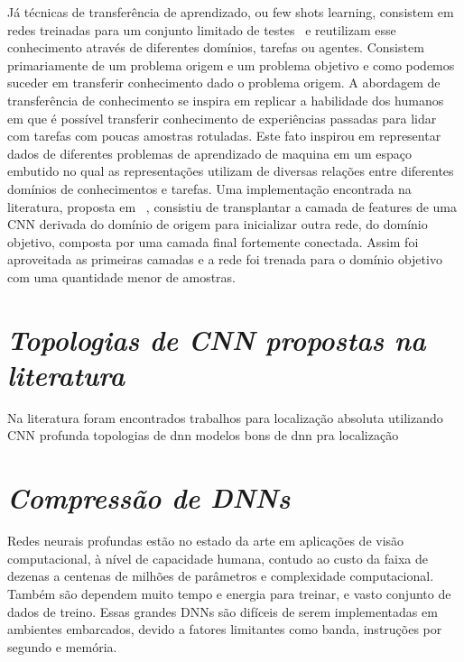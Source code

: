 Já técnicas de transferência de aprendizado, ou few shots learning, consistem em redes treinadas para um conjunto limitado de testes~\cite{rostami2019learning}
e reutilizam esse conhecimento através de diferentes domínios, tarefas ou agentes. Consistem primariamente de um problema origem e um problema objetivo e como podemos suceder em transferir conhecimento dado o problema origem. A abordagem de transferência de conhecimento se inspira em replicar a habilidade dos humanos em que é possível transferir conhecimento de experiências passadas para lidar com tarefas com poucas amostras rotuladas. Este fato inspirou em representar dados de diferentes problemas de aprendizado de maquina em um espaço embutido no qual as representações utilizam de diversas relações entre diferentes domínios de conhecimentos e tarefas. Uma implementação encontrada na literatura, proposta em ~\cite{DBLP:journals/corr/abs-1811-04863}, consistiu de transplantar a camada de features de uma CNN derivada do domínio de origem para inicializar outra rede, do domínio objetivo, composta por uma camada final fortemente conectada. Assim foi aproveitada as primeiras camadas e a rede foi trenada para o domínio objetivo com uma quantidade menor de amostras.

\section{\textit{Topologias de CNN propostas na literatura}}\label{sec:Cap2_MR}

 Na literatura foram encontrados trabalhos para localização absoluta utilizando CNN profunda
topologias de dnn  modelos bons de dnn pra localização 





\section{\textit{Compressão de DNNs}}\label{sec:Cap2_MR}


Redes neurais profundas estão no estado da arte em aplicações de visão computacional, à nível de capacidade humana, contudo ao custo da faixa de dezenas a centenas de milhões de parâmetros e complexidade computacional. Também são dependem muito tempo e energia para treinar, e vasto conjunto de dados de treino. Essas grandes DNNs são difíceis de serem implementadas em ambientes embarcados, devido a fatores limitantes como banda, instruções por segundo e memória. 


